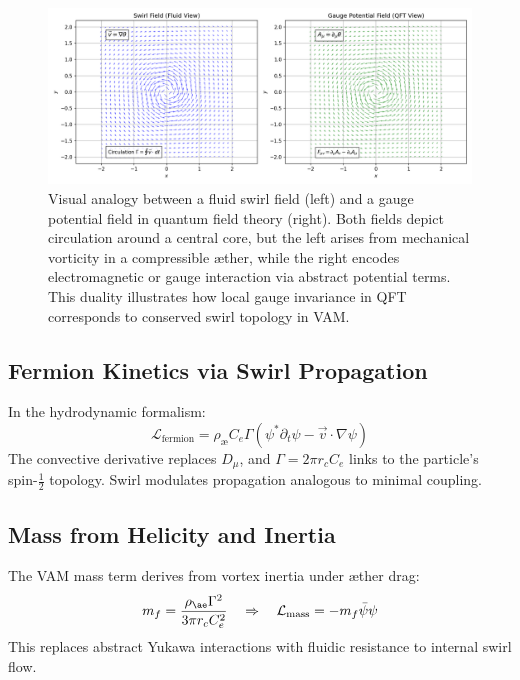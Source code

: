 \begin{figure}[H]
    \centering
    \includegraphics[width=0.9\linewidth]{images/SwirlVSGauge}
    \caption{
        Visual analogy between a fluid swirl field (left) and a gauge potential field in quantum field theory (right).
        Both fields depict circulation around a central core, but the left arises from mechanical vorticity in a compressible \ae{}ther,
        while the right encodes electromagnetic or gauge interaction via abstract potential terms.
        This duality illustrates how local gauge invariance in QFT corresponds to conserved swirl topology in VAM.
    }
    \label{fig:swirl_gauge_analogy}
\end{figure}

\subsection{Fermion Kinetics via Swirl Propagation}
In the hydrodynamic formalism:
\begin{equation}
    \mathcal{L}_{\text{fermion}} = \rho_\text{\ae} C_e \Gamma \left( \psi^* \partial_t \psi - \vec{v} \cdot \nabla \psi \right)
\end{equation}
The convective derivative replaces $D_\mu$, and $\Gamma = 2\pi r_c C_e$ links to the particle's spin-$\tfrac{1}{2}$ topology. Swirl modulates propagation analogous to minimal coupling.

\subsection{Mass from Helicity and Inertia}
The VAM mass term derives from vortex inertia under \ae{}ther drag:
\begin{equation}
    m_f = \frac{\rho_{\ae} \Gamma^2}{3\pi r_c C_e^2} \quad\Rightarrow\quad \mathcal{L}_{\text{mass}} = -m_f \bar{\psi} \psi
\end{equation}
This replaces abstract Yukawa interactions with fluidic resistance to internal swirl flow.

